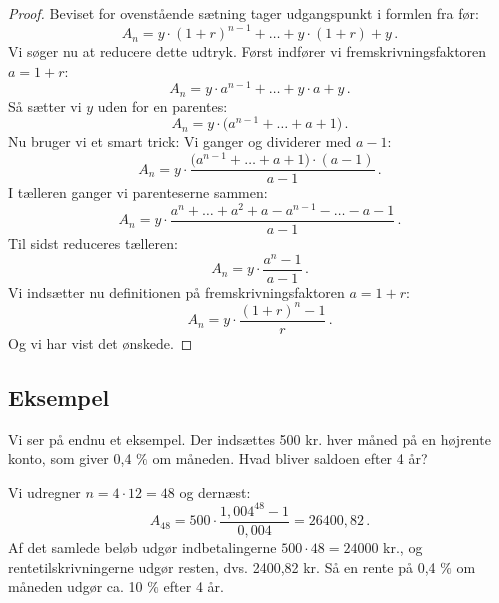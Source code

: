 \documentclass[12pt,oneside,a4paper]{article}
\begin{document}
\begin{tcolorbox}
\begin{proof}
Beviset for ovenstående sætning tager udgangspunkt i formlen fra før:
\[
A_n = y\cdot(1+r)^{n-1} + \ldots + y\cdot(1+r) + y \,.
\]
Vi søger nu at reducere dette udtryk. Først indfører vi fremskrivningsfaktoren $a=1+r$:
\[
A_n = y\cdot a^{n-1} + \ldots + y\cdot a + y \,.
\]
Så sætter vi $y$ uden for en parentes:
\[
A_n = y\cdot\big(a^{n-1} + \ldots + a + 1\big) \,.
\]
Nu bruger vi et smart trick: Vi ganger og dividerer med $a-1$:
\[
A_n = y\cdot\frac{\big(a^{n-1} + \ldots + a + 1\big)\cdot(a-1)}{a-1} \,.
\]
I tælleren ganger vi parenteserne sammen:
\[
A_n = y\cdot\frac{a^{n} + \ldots + a^2 + a - a^{n-1} - \ldots - a - 1}{a-1} \,.
\]
Til sidst reduceres tælleren:
\[
A_n = y\cdot\frac{a^{n} - 1}{a-1} \,.
\]
Vi indsætter nu definitionen på fremskrivningsfaktoren $a=1+r$:
\[
A_n = y\cdot\frac{(1+r)^{n} - 1}{r} \,.
\]
Og vi har vist det ønskede.
\end{proof}
\end{tcolorbox}

\begin{tcolorbox}
\subsection{Eksempel}
Vi ser på endnu et eksempel. Der indsættes 500 kr. hver måned på en højrente konto, som giver
0,4 $\%$ om måneden. Hvad bliver saldoen efter 4 år?

Vi udregner $n=4\cdot12 = 48$ og dernæst:
\[
A_{48} = 500\cdot\frac{1,004^{48}-1}{0,004} = 26400,82 \,.
\]
Af det samlede beløb udgør indbetalingerne $500\cdot 48 = 24000$ kr., og rentetilskrivningerne
udgør resten, dvs. 2400,82 kr. Så en rente på 0,4 $\%$ om måneden udgør ca. 10 $\%$ efter 4 år.

\end{tcolorbox}
\end{document}
